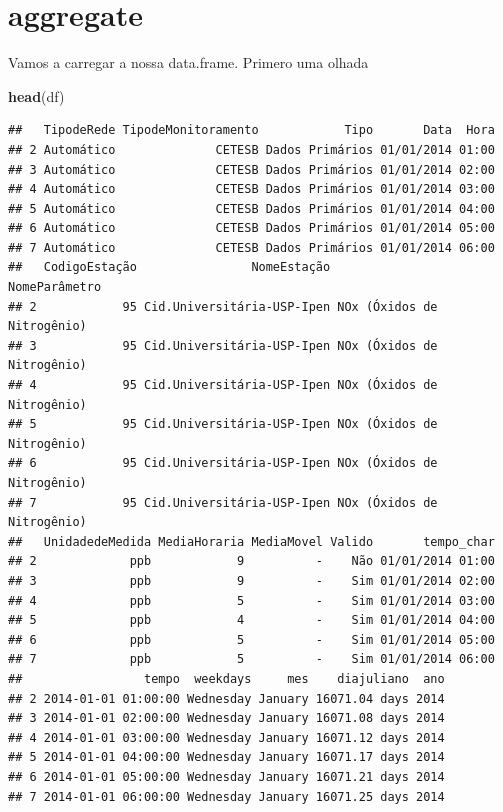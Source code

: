 \documentclass[]{book}
\newenvironment{Shaded}{\begin{snugshade}}{\end{snugshade}}
\newcommand{\KeywordTok}[1]{\textcolor[rgb]{0.13,0.29,0.53}{\textbf{#1}}}
\newcommand{\StringTok}[1]{\textcolor[rgb]{0.31,0.60,0.02}{#1}}
\newcommand{\OperatorTok}[1]{\textcolor[rgb]{0.81,0.36,0.00}{\textbf{#1}}}
\newcommand{\NormalTok}[1]{#1}
\begin{document}
\begin{Shaded}
\end{Shaded}

\section{aggregate}\label{aggregate}

Vamos a carregar a nossa data.frame. Primero uma olhada

\begin{Shaded}
\begin{Highlighting}[]
\KeywordTok{head}\NormalTok{(df)}
\end{Highlighting}
\end{Shaded}

\begin{verbatim}
##   TipodeRede TipodeMonitoramento            Tipo       Data  Hora
## 2 Automático              CETESB Dados Primários 01/01/2014 01:00
## 3 Automático              CETESB Dados Primários 01/01/2014 02:00
## 4 Automático              CETESB Dados Primários 01/01/2014 03:00
## 5 Automático              CETESB Dados Primários 01/01/2014 04:00
## 6 Automático              CETESB Dados Primários 01/01/2014 05:00
## 7 Automático              CETESB Dados Primários 01/01/2014 06:00
##   CodigoEstação                NomeEstação              NomeParâmetro
## 2            95 Cid.Universitária-USP-Ipen NOx (Óxidos de Nitrogênio)
## 3            95 Cid.Universitária-USP-Ipen NOx (Óxidos de Nitrogênio)
## 4            95 Cid.Universitária-USP-Ipen NOx (Óxidos de Nitrogênio)
## 5            95 Cid.Universitária-USP-Ipen NOx (Óxidos de Nitrogênio)
## 6            95 Cid.Universitária-USP-Ipen NOx (Óxidos de Nitrogênio)
## 7            95 Cid.Universitária-USP-Ipen NOx (Óxidos de Nitrogênio)
##   UnidadedeMedida MediaHoraria MediaMovel Valido       tempo_char
## 2             ppb            9          -    Não 01/01/2014 01:00
## 3             ppb            9          -    Sim 01/01/2014 02:00
## 4             ppb            5          -    Sim 01/01/2014 03:00
## 5             ppb            4          -    Sim 01/01/2014 04:00
## 6             ppb            5          -    Sim 01/01/2014 05:00
## 7             ppb            5          -    Sim 01/01/2014 06:00
##                 tempo  weekdays     mes    diajuliano  ano
## 2 2014-01-01 01:00:00 Wednesday January 16071.04 days 2014
## 3 2014-01-01 02:00:00 Wednesday January 16071.08 days 2014
## 4 2014-01-01 03:00:00 Wednesday January 16071.12 days 2014
## 5 2014-01-01 04:00:00 Wednesday January 16071.17 days 2014
## 6 2014-01-01 05:00:00 Wednesday January 16071.21 days 2014
## 7 2014-01-01 06:00:00 Wednesday January 16071.25 days 2014
\end{verbatim}
\end{document}
